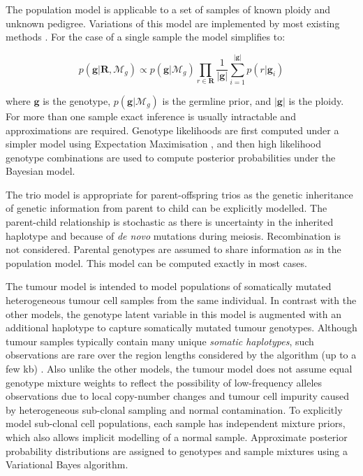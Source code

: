 \documentclass[notitlepage, twocolumn]{article}
\begin{document}
The population model is applicable to a set of samples of known ploidy and unknown pedigree. Variations of this model are implemented by most existing methods \cite{freebayes, gatk, platypus, samtools}. For the case of a single sample the model simplifies to:

\begin{equation*}
    p(\boldsymbol{g} | \boldsymbol{R}, \mathcal{M}_{g}) \propto p(\boldsymbol{g} | \mathcal{M}_{g}) \prod_{r \in \boldsymbol{R}} \frac{1}{|\boldsymbol{g}|} \sum_{i = 1}^{|\boldsymbol{g}|} p(r | \boldsymbol{g}_i)
\end{equation*}

\noindent
where $\boldsymbol{g}$ is the genotype, $p(\boldsymbol{g} | \mathcal{M}_{g})$ is the germline prior, and $|\boldsymbol{g}|$ is the ploidy. For more than one sample exact inference is usually intractable and approximations are required. Genotype likelihoods are first computed under a simpler model using Expectation Maximisation \cite{platypus}, and then high likelihood genotype combinations are used to compute posterior probabilities under the Bayesian model.

The trio model is appropriate for parent-offspring trios as the genetic inheritance of genetic information from parent to child can be explicitly modelled. The parent-child relationship is stochastic as there is uncertainty in the inherited haplotype and because of \emph{de novo} mutations during meiosis. Recombination is not considered. Parental genotypes are assumed to share information as in the population model. This model can be computed exactly in most cases.

The tumour model is intended to model populations of somatically mutated heterogeneous tumour cell samples from the same individual. In contrast with the other models, the genotype latent variable in this model is augmented with an additional haplotype to capture somatically mutated tumour genotypes. Although tumour samples typically contain many unique \emph{somatic haplotypes}, such observations are rare over the region lengths considered by the algorithm (up to a few kb) \cite{rare-somatic}. Also unlike the other models, the tumour model does not assume equal genotype mixture weights to reflect the possibility of low-frequency alleles observations due to local copy-number changes and tumour cell impurity caused by heterogeneous sub-clonal sampling and normal contamination. To explicitly model sub-clonal cell populations, each sample has independent mixture priors, which also allows implicit modelling of a normal sample. Approximate posterior probability distributions are assigned to genotypes and sample mixtures using a Variational Bayes algorithm.
\end{document}
